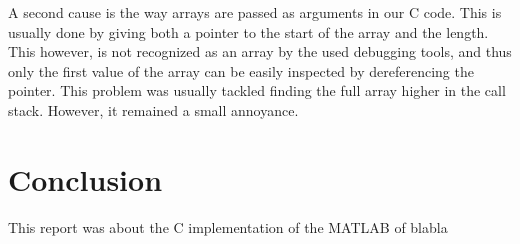\documentclass[a4paper]{article}
\begin{document}
A second cause is the way arrays are passed as arguments in our C code. This is usually done by giving both a pointer to the start of the array and the length. This however, is not recognized as an array by the used debugging tools, and thus only the first value of the array can be easily inspected by dereferencing the pointer. This problem was usually tackled finding the full array higher in the call stack. However, it remained a small annoyance.

\section{Conclusion}
This report was about the C implementation of the MATLAB of blabla
\end{document}
